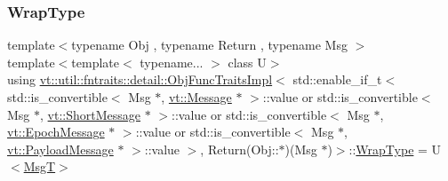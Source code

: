 \subsubsection{\texorpdfstring{Wrap\+Type}{WrapType}}
{\footnotesize\ttfamily template$<$typename Obj , typename Return , typename Msg $>$ \\
template$<$template$<$ typename... $>$ class U$>$ \\
using \hyperlink{structvt_1_1util_1_1fntraits_1_1detail_1_1_obj_func_traits_impl}{vt\+::util\+::fntraits\+::detail\+::\+Obj\+Func\+Traits\+Impl}$<$ std\+::enable\+\_\+if\+\_\+t$<$ std\+::is\+\_\+convertible$<$ Msg $\ast$, \hyperlink{namespacevt_a3a3ddfef40b4c90915fa43cdd5f129ea}{vt\+::\+Message} $\ast$ $>$\+::value or std\+::is\+\_\+convertible$<$ Msg $\ast$, \hyperlink{namespacevt_a1125ac1da6c0bbf141e0ea0739d7602d}{vt\+::\+Short\+Message} $\ast$ $>$\+::value or std\+::is\+\_\+convertible$<$ Msg $\ast$, \hyperlink{namespacevt_ad67368ffae52d7325002586b41bb150e}{vt\+::\+Epoch\+Message} $\ast$ $>$\+::value or std\+::is\+\_\+convertible$<$ Msg $\ast$, \hyperlink{namespacevt_a89a92229c5622b855c02c549f83a1a68}{vt\+::\+Payload\+Message} $\ast$ $>$\+::value $>$, Return(Obj\+::$\ast$)(Msg $\ast$)$>$\+::\hyperlink{structvt_1_1util_1_1fntraits_1_1detail_1_1_obj_func_traits_impl_3_01std_1_1enable__if__t_3_01stdc67616d674616ce71c363c0e039ceb56_a53fe3b9f20ec1f653cc829457c4fabcd}{Wrap\+Type} =  U$<$\hyperlink{structvt_1_1util_1_1fntraits_1_1detail_1_1_obj_func_traits_impl_3_01std_1_1enable__if__t_3_01stdc67616d674616ce71c363c0e039ceb56_aa7f18dbe6abef9456e082ead8aadb75e}{MsgT}$>$}



